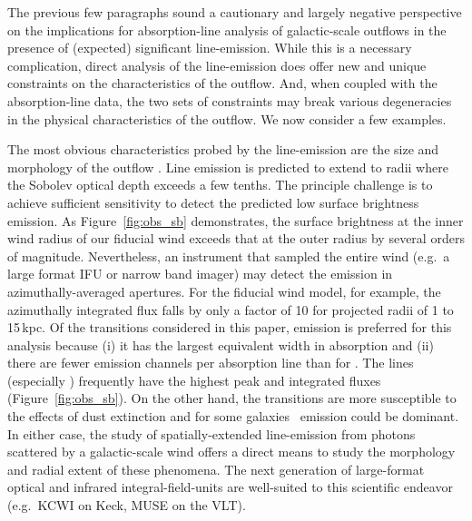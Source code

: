 \documentclass[12pt,preprint]{aastex}
\begin{document}


The previous few paragraphs sound a cautionary and largely negative
perspective on the implications for absorption-line analysis of
galactic-scale outflows in the presence of (expected) significant
line-emission.   While this is a necessary complication, direct analysis of
the line-emission does offer new and unique
constraints on the characteristics of the outflow.  And, when coupled
with the absorption-line data, the two sets of constraints may break
various degeneracies in the physical characteristics of the outflow.
We now consider a few examples.

The most obvious %
characteristics probed 
by the line-emission are
the size and morphology of the outflow \citep{rubin+10c}.  
Line emission is predicted to extend to radii where the Sobolev
optical depth exceeds a few tenths.  The principle
challenge is to achieve sufficient sensitivity to detect the predicted
low
surface brightness emission. As Figure~\ref{fig:obs_sb}
demonstrates, the surface brightness at the inner wind radius of our
fiducial wind exceeds that at the outer radius by several orders of magnitude.
Nevertheless, an instrument that sampled the entire wind (e.g.\ a
large format IFU or narrow band imager) may detect the emission in
azimuthally-averaged apertures. 
For the fiducial wind model, for example, the azimuthally integrated
flux falls by only a factor of 10 for projected radii of 1 to 15\,kpc.
Of the transitions considered in this paper,  emission is
preferred for this analysis because 
(i) it has the largest equivalent width in absorption and
(ii) there are fewer emission channels per absorption line than for
.  The  lines (especially \mgiib) frequently have the
highest peak and integrated fluxes (Figure~\ref{fig:obs_sb}).  
On the other hand, the  transitions are more susceptible to
the effects of dust extinction and for some galaxies \feiis\ emission
could be dominant.  In either case, the study of spatially-extended
line-emission from photons scattered by a galactic-scale wind offers
a direct means to study the morphology and radial extent of these
phenomena.  The next generation of large-format optical and infrared
integral-field-units are well-suited to this scientific endeavor
(e.g.\ KCWI on Keck, MUSE on the VLT).
\end{document}

